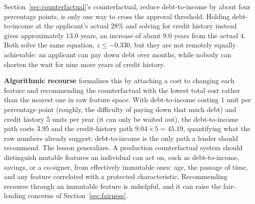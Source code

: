 \documentclass[../ai_in_finance]{subfiles}
\begin{document}
Section~\ref{sec:counterfactual}'s counterfactual, reduce debt-to-income by about four percentage points, is only one way to cross the approval threshold. Holding debt-to-income at the applicant's actual 28\% and solving for credit history instead gives approximately $13.0$ years, an increase of about $9.0$ years from the actual $4$. Both solve the same equation, $z \le -0.330$, but they are not remotely equally achievable: an applicant can pay down debt over months, while nobody can shorten the wait for nine more years of credit history.

\textbf{Algorithmic recourse} \parencite{ustun2019actionable} formalizes this by attaching a cost to changing each feature and recommending the counterfactual with the lowest total cost rather than the nearest one in raw feature space. With debt-to-income costing 1 unit per percentage point (roughly, the difficulty of paying down that much debt) and credit history 5 units per year (it can only be waited out), the debt-to-income path costs $3.95$ and the credit-history path $9.04 \times 5 = 45.19$, quantifying what the raw numbers already suggest: debt-to-income is the only path a lender should recommend. The lesson generalizes. A production counterfactual system should distinguish mutable features an individual can act on, such as debt-to-income, savings, or a co-signer, from effectively immutable ones: age, the passage of time, and any feature correlated with a protected characteristic. Recommending recourse through an immutable feature is unhelpful, and it can raise the fair-lending concerns of Section~\ref{sec:fairness}.
\end{document}
